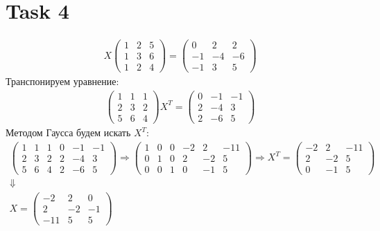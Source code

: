 \section{Task 4}
\begin{gather}
    X\begin{pmatrix}
        1 & 2 & 5 \\
        1 & 3 & 6 \\
        1 & 2 & 4 
    \end{pmatrix} = 
    \begin{pmatrix}
         0 &  2 &  2 \\
        -1 & -4 & -6 \\
        -1 &  3 &  5
    \end{pmatrix}
\end{gather}
Транспонируем уравнение:
\begin{gather}
    \begin{pmatrix}
        1 & 1 & 1 \\
        2 & 3 & 2 \\
        5 & 6 & 4
    \end{pmatrix}
    X^T = 
    \begin{pmatrix}
        0 & -1 & -1 \\
        2 & -4 &  3 \\
        2 & -6 &  5
    \end{pmatrix}
\end{gather}
Методом Гаусса будем искать $X^T$:
\begin{gather}
    \left(\begin{array}{ccc|rrr}
        1 & 1 & 1 & 0 & -1 & -1 \\
        2 & 3 & 2 & 2 & -4 &  3 \\
        5 & 6 & 4 & 2 & -6 &  5
    \end{array}\right)
    \Longrightarrow
    \left(\begin{array}{ccc|rrr}
        1 & 0 & 0 & -2 &  2 & -11 \\
        0 & 1 & 0 &  2 & -2 &  5  \\
        0 & 0 & 1 &  0 & -1 &  5  
    \end{array}\right) \Longrightarrow X^T = 
    \begin{pmatrix}
        -2 &  2 & -11 \\
         2 & -2 &  5  \\
         0 & -1 &  5 
    \end{pmatrix} \\
    \Downarrow \\
    X = 
    \begin{pmatrix}
        -2 &  2 &  0 \\
         2 & -2 & -1 \\
       -11 &  5 &  5
    \end{pmatrix}
\end{gather}

